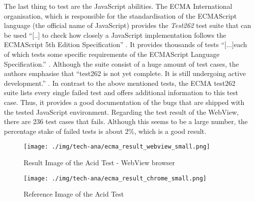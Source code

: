The last thing to test are the JavaScript abilities.
The ECMA International organisation, which is responsible for the standardisation of the ECMAScript language (the official name of JavaScript) provides the \emph{Test262} test suite that can be used \enquote{[..] to check how closely a JavaScript implementation follows the ECMAScript 5th Edition Specification} \autocite{tech-ana:ECMAScript}.
It provides thousands of tests \enquote{[...]each of which tests some specific requirements of the ECMAScript Language Specification.} \autocite{tech-ana:ECMAtest}.
Although the suite consist of a huge amount of test cases, the authors emphasise that \enquote{test262 is not yet complete.
It is still undergoing active development.} \autocite{tech-ana:ECMAtest}.
In contrast to the above mentioned tests, the ECMA test262 suite lists every single failed test and offers additional information to this test case.
Thus, it provides a good documentation of the bugs that are shipped with the tested JavaScript environment.
Regarding the test result of the WebView, there are 236 test cases that fails.
Although this seems to be a large number, the percentage stake of failed tests is about 2\%, which is a good result.
   
\begin{figure}
\begin{minipage}[t]{7cm}
	\centering
	\texttt{[image: ./img/tech-ana/ecma\_result\_webview\_small.png]}
	\caption{Result Image of the Acid Test - WebView browser}
	\label{fig:ecma_webview}
\end{minipage}
\hfill
\begin{minipage}[t]{6cm}
	\centering
	\texttt{[image: ./img/tech-ana/ecma\_result\_chrome\_small.png]}
	\caption{Reference Image of the Acid Test}
	\label{fig:ecma_chrome}
\end{minipage}
\end{figure}



